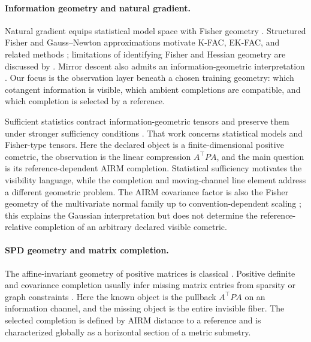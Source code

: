 \documentclass[10pt]{article}
\theoremstyle{plain}
\theoremstyle{definition}
\theoremstyle{remark}
\begin{document}
\paragraph{Information geometry and natural gradient.}
Natural gradient equips statistical model space with Fisher geometry
\citep{amari1998natural}.  Structured Fisher and Gauss--Newton approximations
motivate K-FAC, EK-FAC, and related methods
\citep{martens2015kfac,george2018ekfac,martens2020natural}; limitations of
identifying Fisher and Hessian geometry are discussed by
\citet{kunstner2019limitations}.  Mirror descent also admits an
information-geometric interpretation \citep{raskutti2015information}.  Our
focus is the observation layer beneath a chosen training geometry: which
cotangent information is visible, which ambient completions are compatible,
and which completion is selected by a reference.

Sufficient statistics contract information-geometric tensors and preserve
them under stronger sufficiency conditions \citep{ay2015sufficient}.  That
work concerns statistical models and Fisher-type tensors.  Here the declared
object is a finite-dimensional positive cometric, the observation is the
linear compression \(A^\top PA\), and the main question is its
reference-dependent AIRM completion.  Statistical sufficiency motivates the
visibility language, while the completion and moving-channel line element
address a different geometric problem.
The AIRM covariance factor is also the Fisher geometry of the multivariate
normal family up to convention-dependent scaling
\citep{lovric2000multivariate}; this explains the Gaussian interpretation but
does not determine the reference-relative completion of an arbitrary declared
visible cometric.

\paragraph{SPD geometry and matrix completion.}
The affine-invariant geometry of positive matrices is classical
\citep{bhatia2007positive,pennec2006riemannian}.  Positive definite and
covariance completion usually infer missing matrix entries from sparsity or
graph constraints \citep{dempster1972covariance,grone1984positive}.  Here the
known object is the pullback \(A^\top P A\) on an information channel, and the
missing object is the entire invisible fiber.  The selected completion is
defined by AIRM distance to a reference and is characterized globally as a
horizontal section of a metric submetry.
\end{document}
